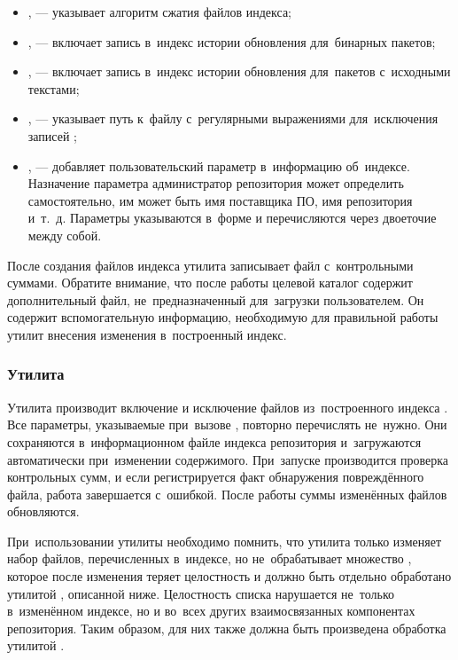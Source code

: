 \begin{itemize}

\item {
,  --- указывает алгоритм сжатия файлов индекса;
}

\item {
,  --- включает запись в~индекс истории обновления для~бинарных пакетов;
}

\item {
,  --- включает запись в~индекс истории обновления для~пакетов с~исходными текстами;
}

\item {
,  --- указывает путь к~файлу с~регулярными выражениями для~исключения записей \requires;
}

\item {
,  --- добавляет пользовательский параметр в~информацию об~индексе.
Назначение параметра администратор репозитория может определить самостоятельно,
им может быть имя поставщика ПО, имя репозитория и~т.~д. 
Параметры указываются в~форме  и перечисляются через двоеточие между собой.
}

\end{itemize}

После создания файлов индекса утилита записывает файл с~контрольными суммами.
Обратите внимание, что после работы целевой каталог содержит дополнительный файл, не~предназначенный для~загрузки пользователем.
Он содержит вспомогательную информацию, необходимую для правильной работы утилит внесения изменения в~построенный индекс.

\subsubsection{Утилита }

Утилита  производит включение и исключение файлов из~построенного индекса \ds.
Все параметры, указываемые при~вызове , повторно перечислять не~нужно.
Они сохраняются в~информационном файле индекса репозитория и~загружаются автоматически при~изменении   содержимого.
При~запуске  производится проверка контрольных сумм, и если регистрируется факт обнаружения повреждённого файла, работа завершается с~ошибкой.
После работы суммы изменённых файлов обновляются.

При~использовании утилиты  необходимо помнить, что утилита только изменяет набор файлов, перечисленных в~индексе, но не~обрабатывает множество \provides,
которое после изменения теряет целостность и должно быть отдельно обработано утилитой , описанной ниже.
Целостность списка \provides нарушается не~только в~изменённом индексе, но и во~всех других взаимосвязанных компонентах репозитория.
Таким образом, для них также должна быть произведена обработка утилитой .

